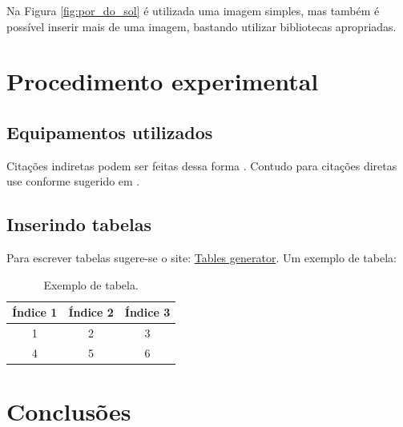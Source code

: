 \documentclass[
	12pt,				%
	openany,
    oneside,			%
	a4paper,			%
	chapter=TITLE,		%
	french,				%
	spanish,			%
	english				%
	]{ifce-relatorio-abntex2}
\begin{document}
Na Figura \ref{fig:por_do_sol} é utilizada uma imagem simples, mas também é possível inserir mais de uma imagem, bastando utilizar bibliotecas apropriadas.
  
\chapter{Procedimento experimental} \label{ch:proced}

\section{Equipamentos utilizados} \label{sec:equip}

Citações indiretas podem ser feitas dessa forma \cite{lathi2006sinais}. Contudo para citações diretas use conforme sugerido em .

\section{Inserindo tabelas} \label{sec:tab}

Para escrever tabelas sugere-se o site: \href{https://www.tablesgenerator.com}{Tables generator}. Um exemplo de tabela:
\begin{table}[H]%
    \centering
    \caption{Exemplo de tabela.}
    \begin{tabular}{ccc}
    \hline
    Índice 1 & Índice 2 & Índice 3 \\ \hline
    1 & 2 & 3 \\
    4 & 5 & 6 \\ \hline
    \end{tabular}
     \label{tab:tabela_indices}
\end{table}

\chapter{Conclusões} \label{ch:conclusao}

\lipsum[2-3]



\end{document}
